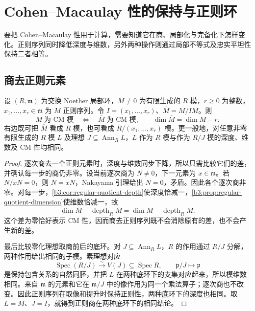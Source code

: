 
\section{Cohen–Macaulay 性的保持与正则环}
\label{b3:sec:1902}

要把 Cohen–Macaulay 性用于计算，需要知道它在商、局部化与完备化下怎样变化。正则序列同时降低深度与维数，另外两种操作则通过局部不等式及忠实平坦性保持二者相等。


%
%

\subsection{商去正则元素}
\label{b3:subsec:1902:01}

\begin{theorem}\label{b3:thm:cm-regular-quotient}
	设 \((R,\mathfrak m)\) 为交换 Noether 局部环，\(M\ne0\) 为有限生成的 \(R\) 模，\(r\ge0\) 为整数，\(x_1,\ldots,x_r\in\mathfrak m\) 为 \(M\) 正则序列。令 \(I=(x_1,\ldots,x_r)\)、\(\overline M=M/IM\)。则
	\[
		M\;\text{为 CM 模}\quad\Longleftrightarrow\quad \overline M\;\text{为 CM 模}, \qquad \dim\overline M=\dim M-r.
	\]
	右边既可把 \(\overline M\) 看成 \(R\) 模，也可看成 \(R/(x_1,\ldots,x_r)\) 模。更一般地，对任意非零有限生成的 \(R\) 模 \(L\) 及理想 \(J\subseteq\operatorname{Ann}_RL\)，\(L\) 作为 \(R\) 模与作为 \(R/J\) 模的深度、维数及 CM 性均相同。
\end{theorem}
\begin{proof}
	逐次商去一个正则元素时，深度与维数同步下降，所以只需比较它们的差，并确认每一步的商仍非零。设当前逐次商为 \(N\ne0\)，下一元素为 \(x\in\mathfrak m\)。若 \(N/xN=0\)，则 \(N=xN\)，Nakayama 引理给出 \(N=0\)，矛盾。因此各个逐次商非零。对每一步，\cref{b3:cor:regular-quotient-depth}使深度恰减一，\cref{b3:prop:regular-quotient-dimension}使维数恰减一，故
	\[
		\dim\overline M-\operatorname{depth}_R\overline M =\dim M-\operatorname{depth}_RM.
	\]
	这个差为零恰好表示 CM 性，因而商去正则序列既不会消除原有的差，也不会产生新的差。

	最后比较零化理想取商前后的底环。对 \(J\subseteq\operatorname{Ann}_RL\)，\(R\) 的作用通过 \(R/J\) 分解，两种作用给出相同的子模。素理想对应
	\[
		\operatorname{Spec}(R/J)\xrightarrow{\sim}V(J)\subseteq\operatorname{Spec}R, \qquad \mathfrak p/J\longmapsto\mathfrak p
	\]
	是保持包含关系的自然同胚，并把 \(L\) 在两种底环下的支集对应起来，所以模维数相同。来自 \(\mathfrak m\) 的元素和它在 \(\mathfrak m/J\) 中的像作用为同一个乘法算子；逐次商也不改变。因此正则序列在取像和提升时保持正则性，两种底环下的深度也相同。取 \(L=\overline M\)、\(J=I\)，就得到正则商在两种底环下的相同结论。
\end{proof}

